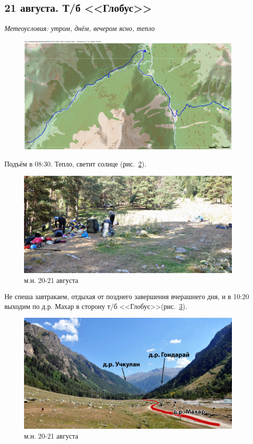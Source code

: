 \subsection{21 августа. Т/б <<Глобус>>}

\textit{Метеоусловия: утром, днём, вечером ясно, тепло}


\begin{figure}[h!]
	\centering
	\includegraphics[angle=0, width=0.7\linewidth]{../pics/mini_maps/21}
	\label{fig:mini_21}
\end{figure}

Подъём в 08:30. Тепло, светит солнце (рис.~\ref{fig:DSC_0993}). 

\begin{figure}[h]
	\centering
	\includegraphics[width=0.7\linewidth]{../pics/DSC_0993}
	\caption{м.н. 20-21 августа}
	\label{fig:DSC_0993}
\end{figure}

Не спеша завтракаем, отдыхая от позднего завершения вчерашнего дня, и в 10:20 выходим по д.р. Махар в сторону т/б <<Глобус>>(рис.~\ref{fig:DSC_1003}). 

\begin{figure}[h]
	\centering
	\includegraphics[width=0.7\linewidth]{../pics/DSC_1003}
	\caption{м.н. 20-21 августа}
	\label{fig:DSC_1003}
\end{figure}

